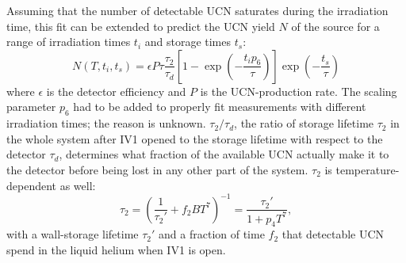 \documentclass[10pt,letterpaper]{article}
\begin{document}
Assuming that the number of detectable UCN saturates during the irradiation time, this fit can be extended to predict the UCN yield $N$ of the source for a range of irradiation times $t_i$ and storage times $t_s$:
\begin{equation}
N(T,t_i,t_s) = \epsilon P \tau \frac{\tau_2}{\tau_d} \left[ 1 - \exp \left( -\frac{t_i p_6}{\tau} \right) \right] \exp \left( -\frac{t_s}{\tau} \right)
\end{equation}
where $\epsilon$ is the detector efficiency and $P$ is the UCN-production rate. The scaling parameter $p_6$ had to be added to properly fit measurements with different irradiation times; the reason is unknown. $\tau_2/\tau_d$, the ratio of storage lifetime $\tau_2$ in the whole system after IV1 opened to the storage lifetime with respect to the detector $\tau_d$, determines what fraction of the available UCN actually make it to the detector before being lost in any other part of the system.
$\tau_2$ is temperature-dependent as well:
\begin{equation}
\tau_2 = \left( \frac{1}{\tau_2'} + f_2 B T^7 \right) ^{-1} = \frac{\tau_2'}{1 + p_4 T^7},
\end{equation}
with a wall-storage lifetime $\tau_2'$ and a fraction of time $f_2$ that detectable UCN spend in the liquid helium when IV1 is open.
\end{document}

